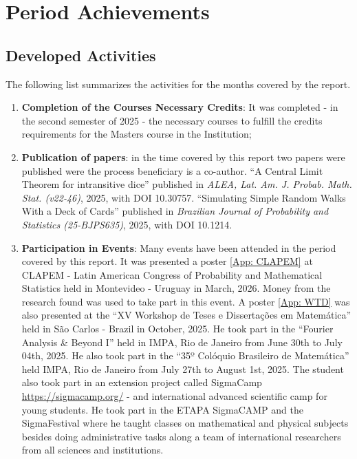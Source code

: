 \documentclass[12pt]{report}
\begin{document}
\sectionfont{\scshape}


\chapter{Period Achievements}\label{chp:realizacoes}

\section{Developed Activities}
\label{section:atividadesdesenvolvidas}

The following list summarizes the activities for the months covered by the report.

\begin{enumerate}
	\item \textbf{Completion of the Courses Necessary Credits}: It was completed  - in the second semester of 2025 - the necessary courses to fulfill the credits requirements for the Masters course in the Institution;
	
	\item \textbf{Publication of papers}: in the time covered by this report two papers were published were the process beneficiary is a co-author.	\enquote{A Central Limit Theorem for intransitive dice} published in \textit{ALEA, Lat. Am. J. Probab. Math. Stat. (v22-46)}, 2025, with DOI 10.30757. 	\enquote{Simulating Simple Random Walks With a Deck of Cards} published in \textit{Brazilian Journal of Probability and Statistics (25-BJPS635)}, 2025, with DOI 10.1214.
	
	\item \textbf{Participation in Events}: Many events have been attended in the period covered by this report. It was presented a poster \eqref{App: CLAPEM} at CLAPEM - Latin American Congress of Probability and Mathematical Statistics held in Montevideo - Uruguay in March, 2026. Money from the research found was used to take part in this event.  A poster \eqref{App: WTD} was also presented at the \enquote{XV Workshop de Teses e Dissertações em Matemática} held in São Carlos - Brazil in October, 2025. He took part in the \enquote{Fourier Analysis \& Beyond I} held in IMPA, Rio de Janeiro from June 30th to July 04th, 2025. He also took part in the \enquote{35º Colóquio Brasileiro de Matemática} held IMPA, Rio de Janeiro from July 27th to August 1st, 2025. The student also took part in an extension project called SigmaCamp \url{https://sigmacamp.org/} - and international advanced scientific camp for young students. He took part in the ETAPA SigmaCAMP and the SigmaFestival where he taught classes on mathematical and physical subjects besides doing administrative tasks along a team of international researchers from all sciences and institutions.
	

\end{enumerate}
\end{document}
